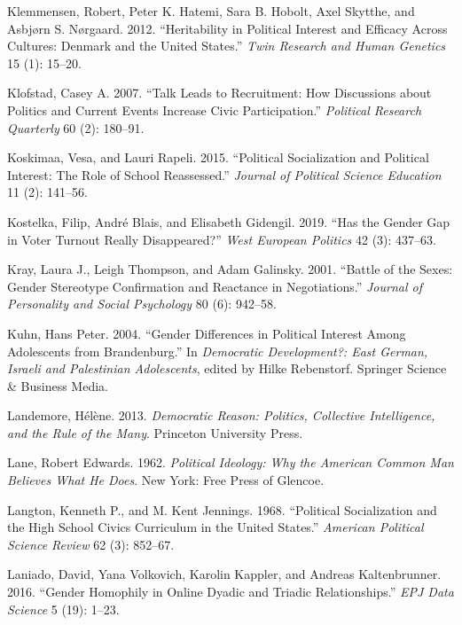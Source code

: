 \documentclass[
  letterpaper,
  DIV=11,
  numbers=noendperiod]{scrreprt}
\newlength{\cslhangindent}
\newenvironment{CSLReferences}[2] %
 {\begin{list}{}{%
  \setlength{\itemindent}{0pt}
  \setlength{\leftmargin}{0pt}
  \setlength{\parsep}{0pt}
  \ifodd #1
   \setlength{\leftmargin}{\cslhangindent}
   \setlength{\itemindent}{-1\cslhangindent}
  \fi
  \setlength{\itemsep}{#2\baselineskip}}}
 {\end{list}}
\begin{document}
\begin{CSLReferences}{1}{0}
Klemmensen, Robert, Peter K. Hatemi, Sara B. Hobolt, Axel Skytthe, and
Asbjørn S. Nørgaard. 2012. {``{Heritability in Political Interest and
Efficacy Across Cultures: Denmark and the United States}.''} \emph{Twin
Research and Human Genetics} 15 (1): 15--20.

Klofstad, Casey A. 2007. {``{Talk Leads to Recruitment: How Discussions
about Politics and Current Events Increase Civic Participation}.''}
\emph{Political Research Quarterly} 60 (2): 180--91.

Koskimaa, Vesa, and Lauri Rapeli. 2015. {``{Political Socialization and
Political Interest: The Role of School Reassessed}.''} \emph{Journal of
Political Science Education} 11 (2): 141--56.

Kostelka, Filip, André Blais, and Elisabeth Gidengil. 2019. {``{Has the
Gender Gap in Voter Turnout Really Disappeared?}''} \emph{West European
Politics} 42 (3): 437--63.

Kray, Laura J., Leigh Thompson, and Adam Galinsky. 2001. {``{Battle of
the Sexes: Gender Stereotype Confirmation and Reactance in
Negotiations}.''} \emph{Journal of Personality and Social Psychology} 80
(6): 942--58.

Kuhn, Hans Peter. 2004. {``{Gender Differences in Political Interest
Among Adolescents from Brandenburg}.''} In \emph{{Democratic
Development?: East German, Israeli and Palestinian Adolescents}}, edited
by Hilke Rebenstorf. Springer Science \& Business Media.

Landemore, Hélène. 2013. \emph{{Democratic Reason: Politics, Collective
Intelligence, and the Rule of the Many}}. Princeton University Press.

Lane, Robert Edwards. 1962. \emph{{Political Ideology: Why the American
Common Man Believes What He Does}}. New York: Free Press of Glencoe.

Langton, Kenneth P., and M. Kent Jennings. 1968. {``{Political
Socialization and the High School Civics Curriculum in the United
States}.''} \emph{American Political Science Review} 62 (3): 852--67.

Laniado, David, Yana Volkovich, Karolin Kappler, and Andreas
Kaltenbrunner. 2016. {``{Gender Homophily in Online Dyadic and Triadic
Relationships}.''} \emph{EPJ Data Science} 5 (19): 1--23.


\end{CSLReferences}
\end{document}
